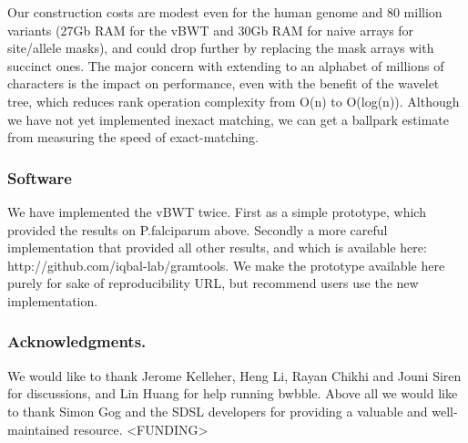 \documentclass[runningheads,a4paper]{llncs}
\begin{document}
Our construction costs are modest even for the human genome and 80 million variants (27Gb RAM for the vBWT and 30Gb RAM for naive arrays for site/allele masks), and could drop further by replacing the mask  arrays with succinct ones. The major concern with extending to an alphabet of millions of characters is the impact on performance,  even with the benefit of the wavelet tree, which reduces rank operation complexity from O(n) to O(log(n)). Although we have not yet implemented inexact matching, we can get a ballpark estimate from measuring the speed of exact-matching.






\subsubsection{Software}
We have implemented the vBWT twice. First as a simple prototype, which provided the results on P.falciparum above. Secondly  a more careful implementation that provided all other results, and which is available here: http://github.com/iqbal-lab/gramtools. We make the prototype available here purely for sake of reproducibility URL, but recommend users use the new implementation.



\subsubsection*{Acknowledgments.} We would like to thank Jerome Kelleher, Heng Li, Rayan Chikhi and Jouni Siren for discussions, and Lin Huang for help running bwbble. Above all we would like to thank Simon Gog and the SDSL developers for providing a valuable and well-maintained resource. <FUNDING>
\end{document}
